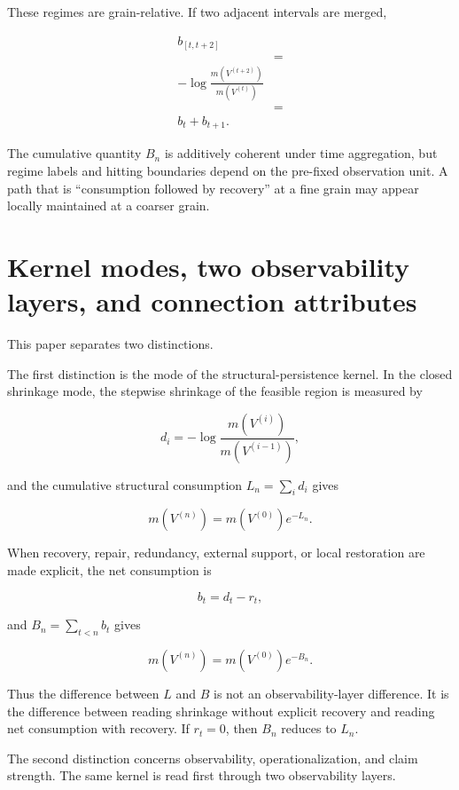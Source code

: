 \documentclass[12pt,a4paper]{article}
\begin{document}
These regimes are grain-relative. If two adjacent intervals are merged,

\[
\begin{aligned}
b_{[t,t+2]} \\
&= \\
-\log\frac{m(V^{(t+2)})}{m(V^{(t)})} \\
&= \\
b_{t}+b_{t+1}.
\end{aligned}
\]

The cumulative quantity \(B_{n}\) is additively coherent under time aggregation, but regime labels and hitting boundaries depend on the pre-fixed observation unit. A path that is ``consumption followed by recovery'' at a fine grain may appear locally maintained at a coarser grain.

\section{Kernel modes, two observability layers, and connection attributes}\label{kernel-modes-two-observability-layers-and-connection-attributes}

This paper separates two distinctions.

The first distinction is the mode of the structural-persistence kernel. In the closed shrinkage mode, the stepwise shrinkage of the feasible region is measured by

\[
d_{i}=-\log\frac{m(V^{(i)})}{m(V^{(i-1)})},
\]

and the cumulative structural consumption \(L_{n}=\sum_{i} d_{i}\) gives

\[
m(V^{(n)})=m(V^{(0)})e^{-L_{n}}.
\]

When recovery, repair, redundancy, external support, or local restoration are made explicit, the net consumption is

\[
b_{t}=d_{t}-r_{t},
\]

and \(B_{n}=\sum_{t<n}b_{t}\) gives

\[
m(V^{(n)})=m(V^{(0)})e^{-B_{n}}.
\]

Thus the difference between \(L\) and \(B\) is not an observability-layer difference. It is the difference between reading shrinkage without explicit recovery and reading net consumption with recovery. If \(r_{t}=0\), then \(B_{n}\) reduces to \(L_{n}\).

The second distinction concerns observability, operationalization, and claim strength. The same kernel is read first through two observability layers.
\end{document}
